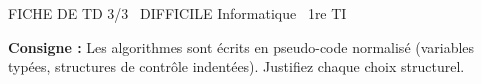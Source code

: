 \documentclass[11pt]{article}
\begin{document}
\begin{tcolorbox}[enhanced,colback=popink,colframe=popink,arc=10pt,boxrule=0pt,left=12pt,right=12pt,top=9pt,bottom=9pt]
{\color{white}\popxbold\small FICHE DE TD 3/3 \textbullet\ DIFFICILE \hfill Informatique \textbullet\ 1re TI\par}
\end{tcolorbox}
\vspace{4pt}
\noindent\textbf{Consigne :} Les algorithmes sont écrits en pseudo-code normalisé (variables typées, structures de contrôle indentées). Justifiez chaque choix structurel.
\end{document}
